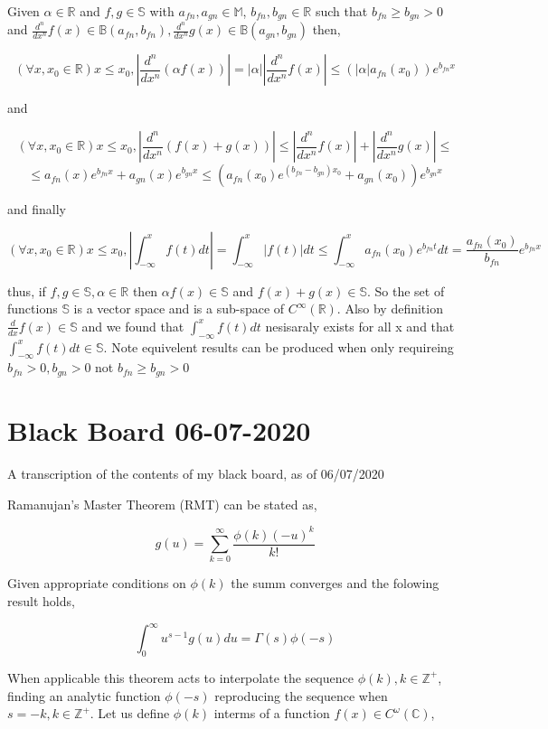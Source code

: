 \documentclass[%
 preprint,
 amsmath, amssymb, aps, pra, 10pt
]{revtex4-2}
\begin{document}
Given $\alpha \in \mathbb{R}$ and $f, g \in \mathbb{S}$ with $a_{fn}, a_{gn} \in \mathbb{M}$, $ b_{fn}, b_{gn} \in \mathbb{R}$ such that $b_{fn} \geq b_{gn} > 0$ and $\frac{d^n}{dx^n} f(x) \in \mathbb{B}(a_{fn}, b_{fn}), \frac{d^n}{dx^n} g(x) \in \mathbb{B}(a_{gn}, b_{gn})$ then,

\[(\forall x, x_0 \in \mathbb{R}) x \leq x_0, \left|\frac{d^n}{dx^n} (\alpha f(x))\right| = |\alpha| \left|\frac{d^n}{dx^n}f(x)\right| \leq (|\alpha| a_{fn}(x_0))e^{b_{fn}x}\]

and

\[(\forall x, x_0 \in \mathbb{R}) x \leq x_0, \left|\frac{d^n}{dx^n}(f(x) + g(x))\right| \leq \left|\frac{d^n}{dx^n} f(x)\right| + \left|\frac{d^n}{dx^n} g(x)\right| \leq \]
\[\leq a_{fn}(x)e^{b_{fn}x} + a_{gn}(x)e^{b_{gn}x} \leq \left(a_{fn}(x_0)e^{(b_{fn} - b_{gn})x_0} + a_{gn}(x_0)\right)e^{b_{gn}x}\]

and finally

\[(\forall x, x_0 \in \mathbb{R}) x \leq x_0, \left|\int_{-\infty}^x f(t)dt\right| = \int_{-\infty}^x \left|f(t)\right| dt \leq \int_{-\infty}^x a_{fn}(x_0)e^{b_{fn}t}dt = \frac{a_{fn}(x_0)}{b_{fn}}e^{b_{fn}x}\]

thus, if $f, g \in \mathbb{S}, \alpha \in \mathbb{R}$ then $\alpha f(x) \in \mathbb{S}$ and $f(x) + g(x) \in \mathbb{S}$. So the set of functions $\mathbb{S}$ is a vector space and is a sub-space of $C^\infty(\mathbb{R})$. Also by definition $\frac{d}{dx}f(x) \in \mathbb{S}$ and we found that $\int_{-\infty}^x f(t)dt$ nesisaraly exists for all x and that $\int_{-\infty}^x f(t)dt \in \mathbb{S}$. Note equivelent results can be produced when only requireing $b_{fn}>0, b_{gn}>0$ not $b_{fn}\geq b_{gn} > 0$

\section{Black Board 06-07-2020}

A transcription of the contents of my black board, as of 06/07/2020

Ramanujan's Master Theorem (RMT) can be stated as,

\[g(u) = \sum_{k=0}^\infty \frac{\phi(k)(-u)^k}{k!}\]

Given appropriate conditions on $\phi(k)$ the summ converges and the folowing result holds,

\[\int_0^{\infty} u^{s-1}g(u)du = \Gamma(s)\phi(-s)\]

When applicable this theorem acts to interpolate the sequence $\phi(k), k \in \mathbb{Z}^+$, finding an analytic function $\phi(-s)$ reproducing the sequence when $s = -k, k \in \mathbb{Z}^+$. Let us define $\phi(k)$ interms of a function $f(x) \in C^{\omega}(\mathbb{C})$,
\end{document}
